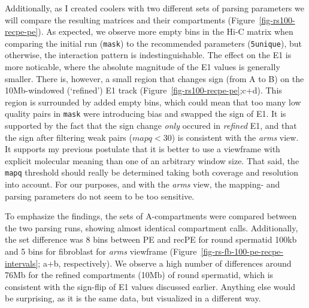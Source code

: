\documentclass[
  11pt,
  a4paper,
]{scrbook}
\begin{document}
Additionally, as I created coolers with two different sets of parsing
parameters we will compare the resulting matrices and their compartments
(Figure~\ref{fig-rs100-recpe-pe}). As expected, we observe more empty
bins in the Hi-C matrix when comparing the initial run (\texttt{mask})
to the recommended parameters (\texttt{5unique}), but otherwise, the
interaction pattern is indestinguishable. The effect on the E1 is more
noticable, where the absolute magnitude of the E1 values is generally
smaller. There is, however, a small region that changes sign (from A to
B) on the 10Mb-windowed (`refined') E1 track
(Figure~\ref{fig-rs100-recpe-pe};c+d). This region is surrounded by
added empty bins, which could mean that too many low quality pairs in
\texttt{mask} were introducing bias and swapped the sign of E1. It is
supported by the fact that the sign change \emph{only} occured in
\emph{refined} E1, and that the sign after filtering weak pairs
(\(mapq < 30\)) is consistent with the \emph{arms} view. It supports my
previous postulate that it is better to use a viewframe with explicit
molecular meaning than one of an arbitrary window size. That said, the
\texttt{mapq} threshold should really be determined taking both coverage
and resolution into account. For our purposes, and with the \emph{arms}
view, the mapping- and parsing parameters do not seem to be too
sensitive.

To emphasize the findings, the sets of A-compartments were compared
between the two parsing runs, showing almost identical compartment
calls. Additionally, the set difference was 8 bins between PE and recPE
for round spermatid 100kb and 5 bins for fibroblast for \emph{arms}
viewframe (Figure~\ref{fig-rs-fb-100-pe-recpe-intervals}; a+b,
respectively). We observe a high number of differences around 76Mb for
the refined compartments (10Mb) of round spermatid, which is consistent
with the sign-flip of E1 values discussed earlier. Anything else would
be surprising, as it is the same data, but visualized in a different
way.
\end{document}
